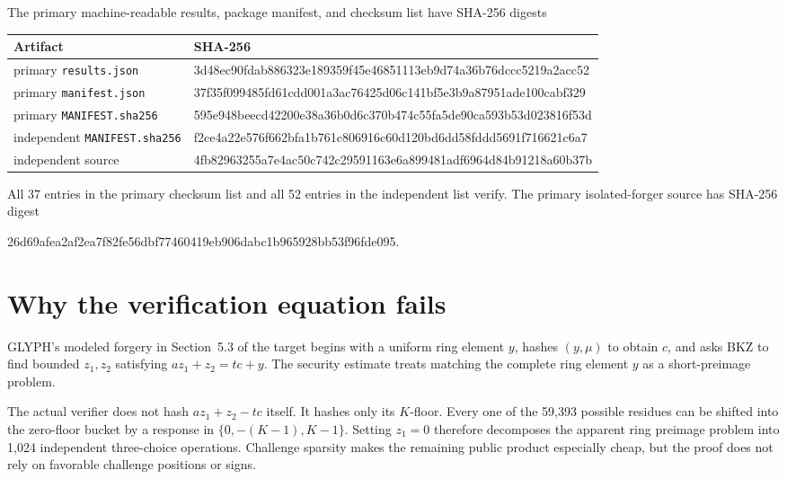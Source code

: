 \documentclass[10pt,a4paper]{article}
\begin{document}
The primary machine-readable results, package manifest, and checksum list
have SHA-256 digests
\begin{center}
\begin{tabular}{ll}
\toprule
Artifact & SHA-256 \\
\midrule
primary \texttt{results.json}
& \ttfamily\footnotesize 3d48ec90fdab886323e189359f45e46851113eb9d74a36b76dccc5219a2acc52 \\
primary \texttt{manifest.json}
& \ttfamily\footnotesize 37f35f099485fd61cdd001a3ac76425d06c141bf5e3b9a87951ade100cabf329 \\
primary \texttt{MANIFEST.sha256}
& \ttfamily\footnotesize 595e948beecd42200e38a36b0d6c370b474c55fa5de90ca593b53d023816f53d \\
independent \texttt{MANIFEST.sha256}
& \ttfamily\footnotesize f2ce4a22e576f662bfa1b761c806916c60d120bd6dd58fddd5691f716621c6a7 \\
independent source
& \ttfamily\footnotesize 4fb82963255a7e4ac50c742c29591163e6a899481adf6964d84b91218a60b37b \\
\bottomrule
\end{tabular}
\end{center}
All 37 entries in the primary checksum list and all 52 entries in the
independent list verify.  The primary isolated-forger source has SHA-256
digest
\begin{center}
\small\ttfamily
26d69afea2af2ea7f82fe56dbf77460419eb906dabc1b965928bb53f96fde095.
\end{center}

\section{Why the verification equation fails}

GLYPH's modeled forgery in Section~5.3 of the target begins with a uniform
ring element $y$, hashes $(y,\mu)$ to obtain $c$, and asks BKZ to find bounded
$z_1,z_2$ satisfying $az_1+z_2=tc+y$.  The security estimate treats matching
the complete ring element $y$ as a short-preimage problem.

The actual verifier does not hash $az_1+z_2-tc$ itself.  It hashes only its
$K$-floor.  Every one of the 59,393 possible residues can be shifted into the
zero-floor bucket by a response in $\{0,-(K-1),K-1\}$.  Setting $z_1=0$
therefore decomposes the apparent ring preimage problem into 1,024 independent
three-choice operations.  Challenge sparsity makes the remaining public
product especially cheap, but the proof does not rely on favorable
challenge positions or signs.
\end{document}
